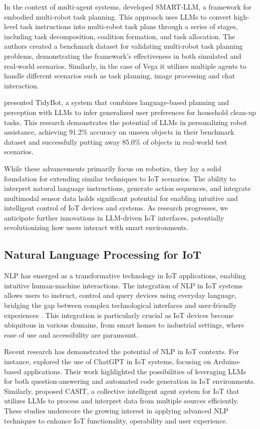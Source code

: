 \documentclass{ieeeaccess}
\begin{document}
In the context of multi-agent systems, \citet{kannan2024smartllmsmartmultiagentrobot} developed SMART-LLM, a framework for embodied multi-robot task planning. This approach uses LLMs to convert high-level task instructions into multi-robot task plans through a series of stages, including task decomposition, coalition formation, and task allocation. The authors created a benchmark dataset for validating multi-robot task planning problems, demonstrating the framework's effectiveness in both simulated and real-world scenarios. Similarly, in the case of Vega it utilizes multiple agents to handle different scenarios such as task planning, image processing and chat interaction.

\citet{Wu2023} presented TidyBot, a system that combines language-based planning and perception with LLMs to infer generalized user preferences for household clean-up tasks. This research demonstrates the potential of LLMs in personalizing robot assistance, achieving 91.2\% accuracy on unseen objects in their benchmark dataset and successfully putting away 85.0\% of objects in real-world test scenarios.

While these advancements primarily focus on robotics, they lay a solid foundation for extending similar techniques to IoT scenarios. The ability to interpret natural language instructions, generate action sequences, and integrate multimodal sensor data holds significant potential for enabling intuitive and intelligent control of IoT devices and systems. As research progresses, we anticipate further innovations in LLM-driven IoT interfaces, potentially revolutionizing how users interact with smart environments.

\subsection{Natural Language Processing for IoT}
NLP has emerged as a transformative technology in IoT applications, enabling intuitive human-machine interactions. The integration of NLP in IoT systems allows users to instruct, control and query devices using everyday language, bridging the gap between complex technological interfaces and user-friendly experiences \cite{10.1145/3643505}. This integration is particularly crucial as IoT devices become ubiquitous in various domains, from smart homes to industrial settings, where ease of use and accessibility are paramount.

Recent research has demonstrated the potential of NLP in IoT contexts. For instance, \citet{10315791} explored the use of ChatGPT in IoT systems, focusing on Arduino-based applications. Their work highlighted the possibilities of leveraging LLMs for both question-answering and automated code generation in IoT environments. Similarly, \citet{10439991} proposed CASIT, a collective intelligent agent system for IoT that utilizes LLMs to process and interpret data from multiple sources efficiently. These studies underscore the growing interest in applying advanced NLP techniques to enhance IoT functionality, operability and user experience.
\end{document}

